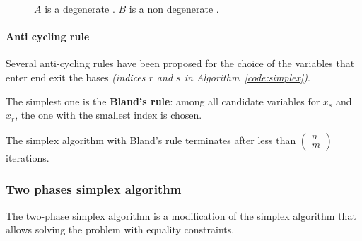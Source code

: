 \documentclass[english]{article}
\begin{document}
\begin{figure}[htbp]
  \bigskip
  \centering
  \caption{\(A\) is a degenerate \BFS. \(B\) is a non degenerate \BFS.}
  \label{fig:degenerate-solutions}
  \centering
\end{figure}

\paragraph{Anti cycling rule}

Several anti-cycling rules have been proposed for the choice of the variables that enter end exit the bases \textit{(indices \(r\) and \(s\) in Algorithm~\ref{code:simplex})}.

The simplest one is the \textbf{Bland's rule}: among all candidate variables for \(x_s\) and \(x_r\), the one with the smallest index is chosen.

\begin{property}
  The simplex algorithm with Bland's rule terminates after less than \(\begin{pmatrix}
    n \\ m
  \end{pmatrix}\) iterations.
\end{property}

\subsubsection{Two phases simplex algorithm}

The two-phase simplex algorithm is a modification of the simplex algorithm that allows solving the \LP problem with equality
constraints.
\end{document}
